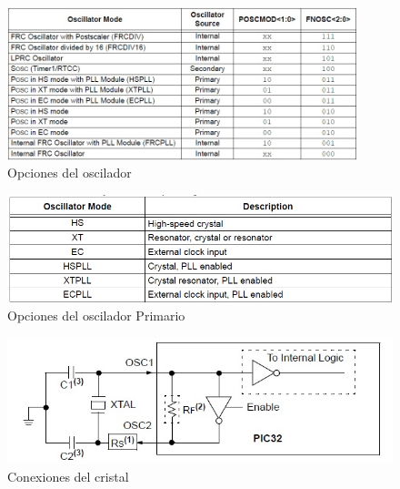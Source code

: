 \documentclass[12pt,letterpaper,twoside]{book}
\begin{document}
\begin{figure}
\centering
\includegraphics[width=4in]{oscilador.jpg}
\caption{Opciones del oscilador}
\label{fig9}
\end{figure}


\begin{figure}
\centering
\includegraphics[width=4.5in]{osciladorPrimario.jpg}
\caption{Opciones del oscilador Primario}
\label{fig10}
\end{figure}

\begin{figure}
\centering
\includegraphics[width=4.5in]{cristal.jpg}
\caption{Conexiones del cristal}
\label{fig11}
\end{figure}



\backmatter
\end{document}
